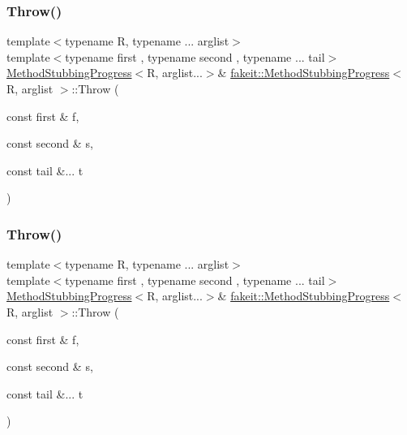 \mbox{\label{structfakeit_1_1MethodStubbingProgress_a516a0ade529c61e4ab6df1bf47f3f1b2}} 
\subsubsection{\texorpdfstring{Throw()}{Throw()}\hspace{0.1cm}{\footnotesize\ttfamily [11/27]}}
{\footnotesize\ttfamily template$<$typename R, typename ... arglist$>$ \\
template$<$typename first , typename second , typename ... tail$>$ \\
\mbox{\hyperlink{structfakeit_1_1MethodStubbingProgress}{Method\+Stubbing\+Progress}}$<$R, arglist...$>$\& \mbox{\hyperlink{structfakeit_1_1MethodStubbingProgress}{fakeit\+::\+Method\+Stubbing\+Progress}}$<$ R, arglist $>$\+::Throw (\begin{DoxyParamCaption}\item[{const first \&}]{f,  }\item[{const second \&}]{s,  }\item[{const tail \&...}]{t }\end{DoxyParamCaption})\hspace{0.3cm}{\ttfamily [inline]}}

\mbox{\label{structfakeit_1_1MethodStubbingProgress_a516a0ade529c61e4ab6df1bf47f3f1b2}} 
\subsubsection{\texorpdfstring{Throw()}{Throw()}\hspace{0.1cm}{\footnotesize\ttfamily [12/27]}}
{\footnotesize\ttfamily template$<$typename R, typename ... arglist$>$ \\
template$<$typename first , typename second , typename ... tail$>$ \\
\mbox{\hyperlink{structfakeit_1_1MethodStubbingProgress}{Method\+Stubbing\+Progress}}$<$R, arglist...$>$\& \mbox{\hyperlink{structfakeit_1_1MethodStubbingProgress}{fakeit\+::\+Method\+Stubbing\+Progress}}$<$ R, arglist $>$\+::Throw (\begin{DoxyParamCaption}\item[{const first \&}]{f,  }\item[{const second \&}]{s,  }\item[{const tail \&...}]{t }\end{DoxyParamCaption})\hspace{0.3cm}{\ttfamily [inline]}}

